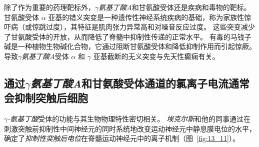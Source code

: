 除了作为重要的药理靶标外，\textit{$\gamma$氨基丁酸A}和甘氨酸受体还是疾病和毒物的靶标。
甘氨酸受体 $\alpha$ 亚基的错义突变是一种遗传性神经系统疾病的基础，称为家族性惊吓病（或惊跳过度），其特征是肌肉张力异常高和对噪音反应过度。
这些突变减少了甘氨酸受体的开放，从而降低了脊髓中抑制性传递的正常水平。
有毒的马钱子碱是一种植物生物碱化合物，它通过阻断甘氨酸受体和降低抑制作用而引起惊厥。
导致\textit{$\gamma$氨基丁酸A}受体 $\alpha$ 和 $\gamma$ 亚基截断的无义突变与先天性癫痫有关。



\subsection{通过\textit{$\gamma$氨基丁酸A}和甘氨酸受体通道的氯离子电流通常会抑制突触后细胞}

\textit{$\gamma$-氨基丁酸}受体的功能与其生物物理特性密切相关。
\textit{埃克尔斯}和他的同事通过在刺激突触前抑制性中间神经元的同时系统地改变运动神经元中静息膜电位的水平，确定了\textit{抑制性突触后电位}在脊髓运动神经元中的离子机制（图~\ref{fig:13_11}）。


